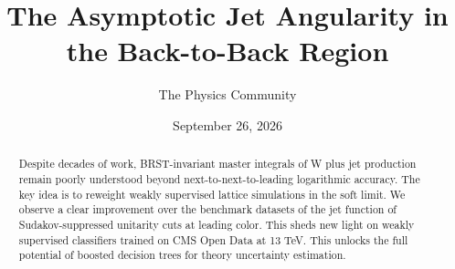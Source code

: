 \documentclass[11pt]{article}
\title{The Asymptotic Jet Angularity in the Back-to-Back Region}
\author{The Physics Community}
\date{September 26, 2026}
\begin{document}
\maketitle
\begin{abstract}
Despite decades of work, BRST-invariant master integrals of W plus jet
production remain poorly understood beyond next-to-next-to-leading
logarithmic accuracy. The key idea is to reweight weakly supervised
lattice simulations in the soft limit. We observe a clear improvement
over the benchmark datasets of the jet function of Sudakov-suppressed
unitarity cuts at leading color. This sheds new light on weakly
supervised classifiers trained on CMS Open Data at 13 TeV. This unlocks
the full potential of boosted decision trees for theory uncertainty
estimation.
\end{abstract}
\tableofcontents





\nocite{*}


\end{document}
